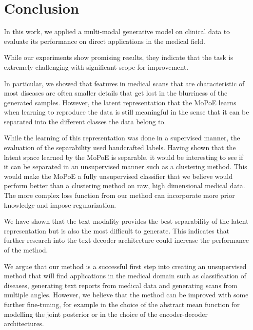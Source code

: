 \section{Conclusion}
In this work, we applied a multi-modal generative model on clinical data to evaluate its performance on direct applications in the medical field.

While our experiments show promising results, they indicate that the task is extremely challenging with significant scope for improvement.

In particular, we showed that features in medical scans that are characteristic of most diseases are often smaller details that get lost in the blurriness of the generated samples.
However, the latent representation that the MoPoE learns when learning to reproduce the data is still meaningful in the sense that it can be separated into the different classes the data belong to.

While the learning of this representation was done in a supervised manner, the evaluation of the separability used handcrafted labels.
Having shown that the latent space learned by the MoPoE is separable, it would be interesting to see if it can be separated in an unsupervised manner such as a clustering method.
This would make the MoPoE a fully unsupervised classifier that we believe would perform better than a clustering method on raw, high dimensional medical data.
The more complex loss function from our method can incorporate more prior knowledge and impose regularization.


We have shown that the text modality provides the best separability of the latent representation but is also the most difficult to generate.
This indicates that further research into the text decoder architecture could increase the performance of the method.



We argue that our method is a successful first step into creating an unsupervised method that will find applications in the medical domain such as classification of diseases, generating text reports from medical data and generating scans from multiple angles.
However, we believe that the method can be improved with some further fine-tuning, for example in the choice of the abstract mean function for modelling the joint posterior or in the choice of the encoder-decoder architectures.